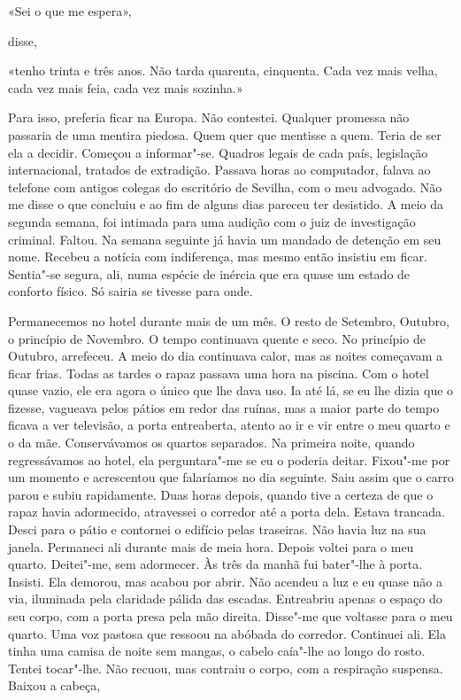 «Sei o que me espera»,

disse,

«tenho trinta e três anos. Não tarda quarenta, cinquenta. Cada vez mais
velha, cada vez mais feia, cada vez mais sozinha.»

Para isso, preferia ficar na Europa. Não contestei. Qualquer promessa
não passaria de uma mentira piedosa. Quem quer que mentisse a quem.
Teria de ser ela a decidir. Começou a informar"-se. Quadros legais de
cada país, legislação internacional, tratados de extradição. Passava
horas ao computador, falava ao telefone com antigos colegas do
escritório de Sevilha, com o meu advogado. Não me disse o que concluiu e
ao fim de alguns dias pareceu ter desistido. A meio da segunda semana,
foi intimada para uma audição com o juiz de investigação criminal.
Faltou. Na semana seguinte já havia um mandado de detenção em seu nome.
Recebeu a notícia com indiferença, mas mesmo então insistiu em ficar.
Sentia"-se segura, ali, numa espécie de inércia que era quase um estado
de conforto físico. Só sairia se tivesse para onde.

Permanecemos no hotel durante mais de um mês. O resto de Setembro,
Outubro, o princípio de Novembro. O tempo continuava quente e seco. No
princípio de Outubro, arrefeceu. A meio do dia continuava calor, mas as
noites começavam a ficar frias. Todas as tardes o rapaz passava uma hora
na piscina. Com o hotel quase vazio, ele era agora o único que lhe dava
uso. Ia até lá, se eu lhe dizia que o fizesse, vagueava pelos pátios em
redor das ruínas, mas a maior parte do tempo ficava a ver televisão, a
porta entreaberta, atento ao ir e vir entre o meu quarto e o da mãe.
Conservávamos os quartos separados. Na primeira noite, quando
regressávamos ao hotel, ela perguntara"-me se eu o poderia deitar.
Fixou"-me por um momento e acrescentou que falaríamos no dia seguinte.
Saiu assim que o carro parou e subiu rapidamente. Duas horas depois,
quando tive a certeza de que o rapaz havia adormecido, atravessei o
corredor até a porta dela. Estava trancada. Desci para o pátio e
contornei o edifício pelas traseiras. Não havia luz na sua janela.
Permaneci ali durante mais de meia hora. Depois voltei para o meu
quarto. Deitei"-me, sem adormecer. Às três da manhã fui bater"-lhe à
porta. Insisti. Ela demorou, mas acabou por abrir. Não acendeu a luz e
eu quase não a via, iluminada pela claridade pálida das escadas.
Entreabriu apenas o espaço do seu corpo, com a porta presa pela mão
direita. Disse"-me que voltasse para o meu quarto. Uma voz pastosa que
ressoou na abóbada do corredor. Continuei ali. Ela tinha uma camisa de
noite sem mangas, o cabelo caía"-lhe ao longo do rosto. Tentei
tocar"-lhe. Não recuou, mas contraiu o corpo, com a respiração suspensa.
Baixou a cabeça,

